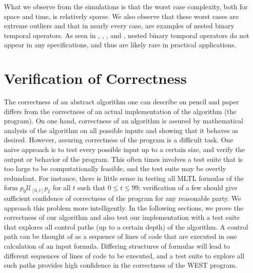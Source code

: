 \documentclass[runningheads]{llncs}
\begin{document}
\vspace{\baselineskip}
\noindent What we observe from the simulations is that the worst case complexity, both for space and time, is relatively sparse. We also observe that these worst cases are extreme outliers and that in nearly every case, are examples of nested binary temporal operators. As seen in \cite{HLR21}, \cite{KZJZR20}, \cite{AJR22}, and \cite{HCHJR21}, nested binary temporal operators do not appear in any specifications, and thus are likely rare in practical applications.
\section{Verification of Correctness} \label{test}
 The correctness of an abstract algorithm one can describe on pencil and paper differs from the correctness of an actual implementation of the algorithm (the program). 
On one hand, correctness of an algorithm is assured by mathematical analysis of the algorithm on all possible inputs and showing that it behaves as desired. 
However, assuring correctness of the program is a difficult task.
One naive approach is to test every possible input up to a certain size, and verify the output or behavior of the program.
This often times involves a test suite that is too large to be computationally feasible, and the test suite may be overtly redundant. 
For instance, there is little sense in testing all MLTL formulas of the form $p_0 \mathcal{U}_{[0,t]} p_1$ for all $t$ such that $0 \leq t \leq 99$; verification of a few should give sufficient confidence of correctness of the program for any reasonable party. 
We approach this problem more intelligently. In the following sections, we prove the correctness of our algorithm and also test our implementation with a test suite that explores all control paths (up to a certain depth) of the algorithm. A control path can be thought of as a sequence of lines of code that are executed in one calculation of an input formula. Differing structures of formulas will lead to different sequences of lines of code to be executed, and a test suite to explore all such paths provides high confidence in the correctness of the WEST program.
\end{document}
